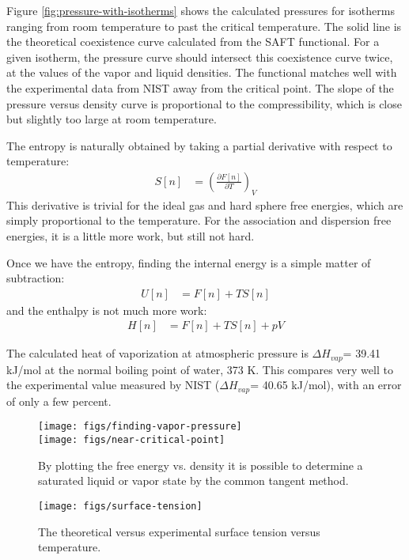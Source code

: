 \documentclass[letterpaper,twocolumn,amsmath,amssymb,prb]{revtex4-1}
\begin{document}
Figure \ref{fig:pressure-with-isotherms} shows the calculated pressures for
isotherms ranging from room temperature to past the critical temperature. The solid 
line is the theoretical coexistence curve calculated from the SAFT functional. 
For a given isotherm, the pressure curve should intersect this coexistence curve 
twice, at the values of the vapor and liquid densities. The functional matches well with
the experimental data from NIST away from the critical point. The slope of the pressure
versus density curve is proportional to the compressibility, which is close but slightly too
large at room temperature. 

The entropy is naturally obtained by taking a partial derivative with
respect to temperature:
\begin{align}
  S[n] &= \left(\frac{\partial F[n]}{\partial T}\right)_{V}
\end{align}
This derivative is trivial for the ideal gas and hard sphere free
energies, which are simply proportional to the temperature.  For the
association and dispersion free energies, it is a little more work,
but still not hard.

Once we have the entropy, finding the internal energy is a simple
matter of subtraction:
\begin{align}
  U[n] &= F[n] + TS[n]
\end{align}
and the enthalpy is not much more work:
\begin{align}
  H[n] &= F[n] + TS[n] + pV
\end{align}

The calculated heat of vaporization at atmospheric pressure is
$\Delta H_{vap}$= 39.41 kJ/mol at the normal boiling point of water,
373 K. This compares very well to the experimental
value measured by NIST ($\Delta H_{vap}$= 40.65 kJ/mol\cite{nistwater}), with 
an error of only a few percent.

\begin{figure}
\begin{center}
\texttt{[image: figs/finding-vapor-pressure]}\\
\texttt{[image: figs/near-critical-point]}
\end{center}
\caption{By plotting the free energy vs. density it is possible to
  determine a saturated liquid or vapor state by the common tangent
  method.  }
\label{fig:homogeneous}
\end{figure}

\begin{figure}
\begin{center}
\texttt{[image: figs/surface-tension]}
\end{center}
\caption{The theoretical versus experimental surface tension
  versus temperature.  }
\label{fig:surface-tension}
\end{figure}
\end{document}
